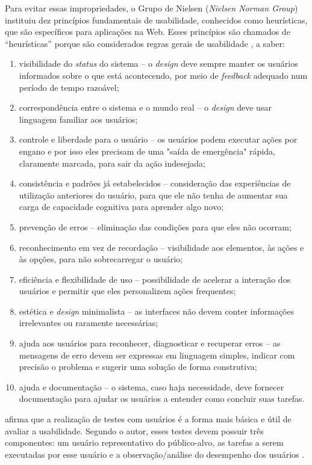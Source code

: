 \documentclass[portuguese]{textolivre}
\begin{document}
	
Para evitar essas impropriedades, o Grupo de Nielsen (\textit{Nielsen Norman Group}) instituiu dez princípios fundamentais de usabilidade, conhecidos como heurísticas, que são específicos para aplicações na Web. Esses princípios são chamados de “heurísticas” porque são considerados regras gerais de usabilidade \cite{nielsen1994}, a saber:

\begin{enumerate}
    \item visibilidade do \textit{status} do sistema – o \textit{design} deve sempre manter os usuários informados sobre o que está acontecendo, por meio de \textit{feedback} adequado num período de tempo razoável;
    \item correspondência entre o sistema e o mundo real – o \textit{design} deve usar linguagem familiar aos usuários;
    \item controle e liberdade para o usuário – os usuários podem executar ações por engano e por isso eles precisam de uma "saída de emergência" rápida, claramente marcada, para sair da ação indesejada;
    \item consistência e padrões já estabelecidos – consideração das experiências de utilização anteriores do usuário, para que ele não tenha de aumentar sua carga de capacidade cognitiva para aprender algo novo;
    \item prevenção de erros – eliminação das condições para que eles não ocorram;
    \item reconhecimento em vez de recordação – visibilidade aos elementos, às ações e às opções, para não sobrecarregar o usuário;
    \item eficiência e flexibilidade de uso – possibilidade de acelerar a interação dos usuários e permitir que eles personalizem ações frequentes;
    \item estética e \textit{design} minimalista – as interfaces não devem conter informações irrelevantes ou raramente necessárias;
    \item ajuda aos usuários para reconhecer, diagnosticar e recuperar erros – as mensagens de erro devem ser expressas em linguagem simples, indicar com precisão o problema e sugerir uma solução de forma construtiva;
    \item ajuda e documentação – o sistema, caso haja necessidade, deve fornecer documentação para ajudar os usuários a entender como concluir suas tarefas.
\end{enumerate}

\textcite{nielsen2012} afirma que a realização de testes com usuários é a forma mais básica e útil de avaliar a usabilidade. Segundo o autor, esses testes devem possuir três componentes: um usuário representativo do público-alvo, as tarefas a serem executadas por esse usuário e a observação/análise do desempenho dos usuários \cite[p.~3]{nielsen2012}.
\end{document}

